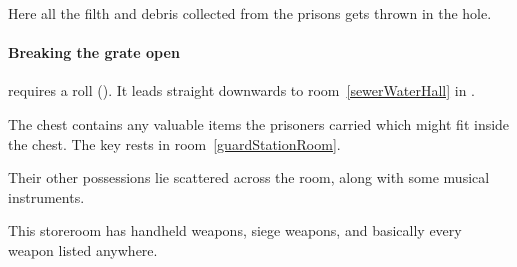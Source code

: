 \begin{multicols}{2}
\label{spyBroth}


Here all the filth and debris collected from the prisons gets thrown in the hole.

\paragraph{Breaking the grate open}
requires a  roll (\tn[10]).
It leads straight downwards to room~\vref{sewerWaterHall} in .


The chest contains any valuable items the prisoners carried which might fit inside the chest.
The key rests in room~\ref{guardStationRoom}.

Their other possessions lie scattered across the room, along with some musical instruments.


This storeroom has handheld weapons, siege weapons, and basically every weapon listed anywhere.%

\end{multicols}
